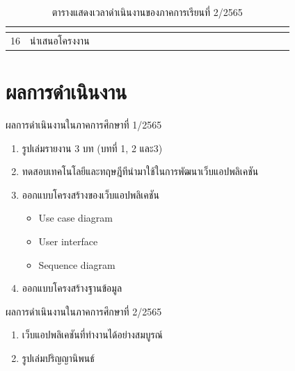 \documentclass[12pt,oneside,openright,a4paper]{cpe-thai-project}
\begin{document}
\begin{table}[!ht]
{\begin{tabular}{|llllllllllllllllllllll|}
      \multicolumn{1}{l|}{} &
      \multicolumn{1}{l|}{} &
      \multicolumn{1}{l|}{} &
      \multicolumn{1}{l|}{} &
      \multicolumn{1}{l|}{} &
      \multicolumn{1}{l|}{} &
      \multicolumn{1}{l|}{} &
      \multicolumn{1}{l|}{} &
      \multicolumn{1}{l|}{\cellcolor[HTML]{FFCE93}} &
      \multicolumn{1}{l|}{\cellcolor[HTML]{FFCE93}} &
      \multicolumn{1}{l|}{\cellcolor[HTML]{FFCE93}} &
      \multicolumn{1}{l|}{\cellcolor[HTML]{FFCE93}} &
      \multicolumn{1}{l|}{\cellcolor[HTML]{FFCE93}} &
      \multicolumn{1}{l|}{\cellcolor[HTML]{FFCE93}} &
      \multicolumn{1}{l|}{\cellcolor[HTML]{FFCE93}} &
      \multicolumn{1}{l|}{\cellcolor[HTML]{FFCE93}} &
      \multicolumn{1}{l|}{} &
      \multicolumn{1}{l|}{} &
      \multicolumn{1}{l|}{} &
       \\ \hline
    \multicolumn{1}{|l|}{16} &
      \multicolumn{1}{l|}{นำเสนอโครงงาน} &
      \multicolumn{1}{l|}{} &
      \multicolumn{1}{l|}{} &
      \multicolumn{1}{l|}{} &
      \multicolumn{1}{l|}{} &
      \multicolumn{1}{l|}{} &
      \multicolumn{1}{l|}{} &
      \multicolumn{1}{l|}{} &
      \multicolumn{1}{l|}{} &
      \multicolumn{1}{l|}{} &
      \multicolumn{1}{l|}{} &
      \multicolumn{1}{l|}{} &
      \multicolumn{1}{l|}{} &
      \multicolumn{1}{l|}{} &
      \multicolumn{1}{l|}{} &
      \multicolumn{1}{l|}{} &
      \multicolumn{1}{l|}{\cellcolor[HTML]{FFCE93}} &
      \multicolumn{1}{l|}{} &
      \multicolumn{1}{l|}{} &
      \multicolumn{1}{l|}{} &
       \\ \hline
    \end{tabular} %
    }
    \caption{\centering  ตารางแสดงเวลาดำเนินงานของภาคการเรียนที่ 2/2565} \label{tbl:working2}
\end{table}


\section{ผลการดำเนินงาน}
\hspace*{1cm} ผลการดำเนินงานในภาคการศึกษาที่ 1/2565
\begin{enumerate}
  \item รูปเล่มรายงาน 3 บท (บทที่ 1, 2 และ3)
  \item ทดสอบเทคโนโลยีและทฤษฎีทีนำมาใช้ในการพัฒนาเว็บแอปพลิเคชัน
  \item ออกแบบโครงสร้างของเว็บแอปพลิเคชัน
    \begin {itemize}
        \item Use case diagram
        \item User interface
        \item Sequence diagram
    \end {itemize}
  \item ออกแบบโครงสร้างฐานข้อมูล
\end{enumerate}
\hspace*{1cm} ผลการดำเนินงานในภาคการศึกษาที่ 2/2565
\begin{enumerate}
  \item เว็บแอปพลิเคชันที่ทำงานได้อย่างสมบูรณ์
  \item รูปเล่มปริญญานิพนธ์
\end{enumerate}
\end{document}
